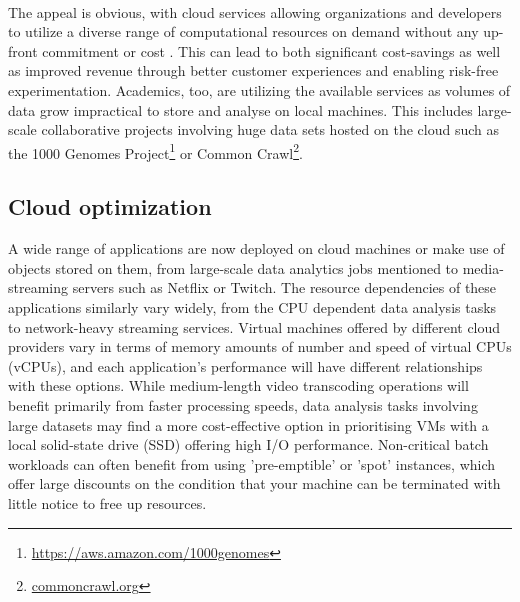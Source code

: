 \documentclass{report}
\begin{document}
\paragraph{}
The appeal is obvious, with cloud services allowing organizations and developers to utilize a diverse range of computational resources on demand without any up-front commitment or cost \cite{Armbrust2009}. This can lead to both significant cost-savings as well as improved revenue through better customer experiences and enabling risk-free experimentation\cite{Power2018}. Academics, too, are utilizing the available services as volumes of data grow impractical to store and analyse on local machines\cite{Berriman2013, Ruiz-Alvarez2011}. This includes large-scale collaborative projects involving huge data sets hosted on the cloud such as the 1000 Genomes Project\footnote{\url{https://aws.amazon.com/1000genomes}} or Common Crawl\footnote{\url{commoncrawl.org}}.

\subsection{Cloud optimization}
A wide range of applications are now deployed on cloud machines or make use of objects stored on them, from large-scale data analytics jobs mentioned to media-streaming servers such as Netflix or Twitch\cite{Bilal2017}. The resource dependencies of these applications similarly vary widely, from the CPU dependent data analysis tasks to network-heavy streaming services. Virtual machines offered by different cloud providers vary in terms of memory amounts of number and speed of virtual CPUs (vCPUs), and each application's performance will have different relationships with these options. While medium-length video transcoding operations will benefit primarily from faster processing speeds, data analysis tasks involving large datasets may find a more cost-effective option in prioritising VMs with a local solid-state drive (SSD) offering high I/O performance. Non-critical batch workloads can often benefit from using 'pre-emptible' or 'spot' instances, which offer large discounts on the condition that your machine can be terminated with little notice to free up resources. 
\end{document}
